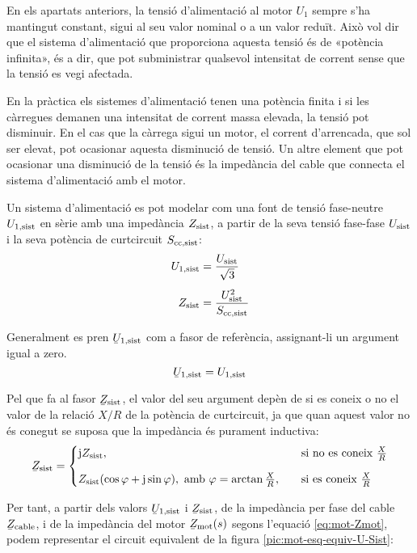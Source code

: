 En els apartats anteriors, la tensió d'alimentació al motor $U_1$ sempre s'ha mantingut constant, sigui al seu valor nominal o a un valor reduït. Això vol dir que el sistema d'alimentació que proporciona aquesta tensió és de «potència infinita», és a dir, que pot subministrar qualsevol intensitat de corrent sense que la tensió es vegi afectada.

En la pràctica els sistemes d'alimentació tenen una potència finita i si les càrregues demanen una intensitat de corrent massa elevada, la tensió pot disminuir. En el cas que la càrrega sigui un motor, el corrent d'arrencada, que sol ser elevat, pot ocasionar aquesta disminució de tensió. Un altre element que pot ocasionar una disminució de la tensió és la impedància del cable que connecta el sistema d'alimentació amb el motor.

Un sistema d'alimentació es pot modelar com una font de tensió fase-neutre $U_\mathrm{1,sist}$ en sèrie amb una impedància $Z_\mathrm{sist}$, a partir de la seva tensió fase-fase $U_\mathrm{sist}$ i la seva potència de curtcircuit $S_\mathrm{cc,sist}$:
\begin{align}
	U_\mathrm{1,sist} &= \frac{U_\mathrm{sist}}{\sqrt{3}} \\[1ex]
	Z_\mathrm{sist} &= \frac{U_\mathrm{sist}^2}{S_\mathrm{cc,sist}}
\end{align}

Generalment es pren $\cmplx{U}\ped{1,sist}$ com a fasor de referència, assignant-li un argument igual a zero. 
\begin{equation}
	\cmplx{U}\ped{1,sist} = U\ped{1,sist}
\end{equation}

Pel que fa al fasor  $\cmplx{Z}\ped{sist}$, el valor del seu argument depèn de si es coneix o no el valor de la relació $X/R$ de la potència de curtcircuit, ja que quan aquest valor no és conegut se suposa que la impedància és purament inductiva:
\begin{equation}
	\cmplx{Z}\ped{sist} = 
	\begin{cases}
		\ju Z\ped{sist},  & \quad\text{si no es coneix }\frac{X}{R}  \\[2ex]
		Z\ped{sist} (\cos\varphi+\ju\sin\varphi), \text{ amb } \varphi=\arctan\frac{X}{R}, & \quad\text{si es coneix } \frac{X}{R} 
	\end{cases}
\end{equation}

Per tant, a partir dels valors $\cmplx{U}\ped{1,sist}$ i $\cmplx{Z}\ped{sist}$, de la impedància per fase del cable $\cmplx{Z}\ped{cable}$, i de la impedància del motor $\cmplx{Z}\ped{mot}(s)$ segons l'equació \eqref{eq:mot-Zmot}, podem representar el circuit equivalent de la figura \vref{pic:mot-esq-equiv-U-Sist}:
\begin{center}
	
	\label{pic:mot-esq-equiv-U-Sist}
\end{center}

